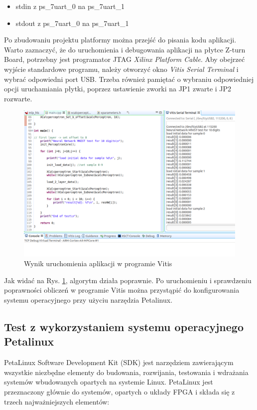 \begin{itemize}
  \item stdin z ps\_7uart\_0 na ps\_7uart\_1
  \item stdout z ps\_7uart\_0 na ps\_7uart\_1
\end{itemize}

Po zbudowaniu projektu platformy można przejść do pisania kodu aplikacji. Warto zaznaczyć, że do uruchomienia i 
debugowania aplikacji na płytce Z-turn Board, potrzebny jest programator JTAG \emph{Xilinx Platform Cable}. Aby 
obejrzeć wyjście standardowe programu, należy otworzyć okno \emph{Vitis Serial Terminal} i wybrać odpowiedni port USB. 
Trzeba również pamiętać o wybraniu odpowiedniej opcji uruchamiania płytki, poprzez ustawienie zworki na JP1 zwarte i 
JP2 rozwarte.

\begin{figure}[!h]
  \centering
  \includegraphics[width=\textwidth]{img/vitis-results.png}
  \caption{Wynik uruchomienia aplikacji w programie Vitis}
  \label{vitis-results}
\end{figure}

Jak widać na Rys. \ref{vitis-results}, algorytm działa poprawnie. Po uruchomieniu i sprawdzeniu poprawności obliczeń w 
programie Vitis można przystąpić do konfigurowania systemu operacyjnego przy użyciu narzędzia Petalinux. 

\subsection{Test z wykorzystaniem systemu operacyjnego Petalinux}

PetaLinux Software Development Kit (SDK) jest narzędziem zawierającym wszystkie niezbędne elementy do budowania,
rozwijania, testowania i wdrażania systemów wbudowanych opartych na systemie Linux. PetaLinux jest przeznaczony głównie 
do systemów, opartych o układy FPGA i składa się z trzech najważniejszych elementów: 

